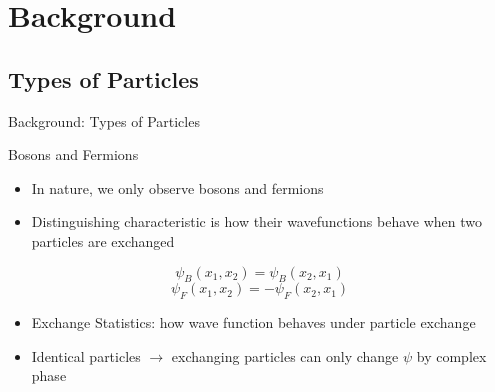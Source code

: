 \documentclass[12pt, usenames, dvipsnames]{beamer}
\begin{document}
\section{Background}

\subsection{Types of Particles}


\begin{frame}[t]{Background: Types of Particles}

\begin{block}{Bosons and Fermions}
\begin{itemize}
\item In nature, we only observe bosons and fermions
\item Distinguishing characteristic is how their wavefunctions behave when two particles are exchanged
\end{itemize}

\[ \psi_{B}(x_{1}, x_{2}) =  \psi_{B}(x_{2}, x_{1}) \]
\[ \psi_{F}(x_{1}, x_{2}) =  -\psi_{F}(x_{2}, x_{1}) \]

\begin{itemize}
\item Exchange Statistics: how wave function behaves under particle exchange
\item Identical particles $\rightarrow$ exchanging particles can only change $\psi$ by complex phase
\end{itemize}

\end{block}



\end{frame}


\end{document}
